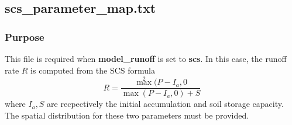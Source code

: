 \subsection{scs\_parameter\_map.txt}
\subsubsection{Purpose}
This file is required when \textbf{model\_runoff} is set to \textbf{scs}. In this case, the runoff rate $R$ is computed from the SCS formula
\begin{equation}
R = \frac{\max^2(P - I_a, 0}{\max(P - I_a, 0) + S}
\end{equation} where $I_a, S$ are recpectively the initial accumulation and soil storage capacity. The spatial distribution for these two parameters must be provided.
%
